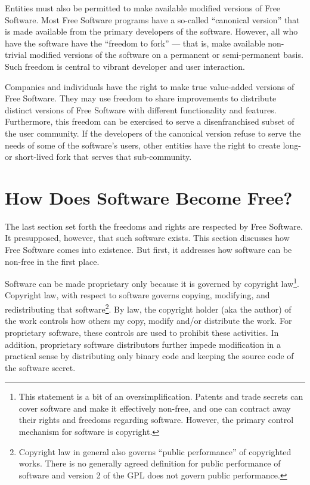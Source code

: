 \documentclass[12pt]{report}
\begin{document}
Entities must also be permitted to make available modified versions of
Free Software.  Most Free Software programs have a so-called ``canonical
version'' that is made available from the primary developers of the
software.  However, all who have the software have the ``freedom to fork''
--- that is, make available non-trivial modified versions of the software
on a permanent or semi-permanent basis.  Such freedom is central to
vibrant developer and user interaction.

Companies and individuals have the right to make true value-added versions
of Free Software.  They may use freedom to share improvements to
distribute distinct versions of Free Software with different functionality
and features.  Furthermore, this freedom can be exercised to serve a
disenfranchised subset of the user community.  If the developers of the
canonical version refuse to serve the needs of some of the software's
users, other entities have the right to create long- or short-lived fork
that serves that sub-community.

\section{How Does Software Become Free?}

The last section set forth the freedoms and rights are respected by Free
Software.  It presupposed, however, that such software exists.  This
section discusses how Free Software comes into existence.  But first, it
addresses how software can be non-free in the first place.

Software can be made proprietary only because it is governed by copyright
law\footnote{This statement is a bit of an oversimplification.  Patents
  and trade secrets can cover software and make it effectively non-free,
  and one can contract away their rights and freedoms regarding software.
  However, the primary control mechanism for software is copyright.}.
Copyright law, with respect to software governs copying, modifying, and
redistributing that software\footnote{Copyright law in general also
  governs ``public performance'' of copyrighted works.  There is no
  generally agreed definition for public performance of software and
  version 2 of the GPL does not govern public performance.}.  By law, the
copyright holder (aka the author) of the work controls how others my copy,
modify and/or distribute the work.  For proprietary software, these
controls are used to prohibit these activities.  In addition, proprietary
software distributors further impede modification in a practical sense by
distributing only binary code and keeping the source code of the software
secret.
\end{document}
